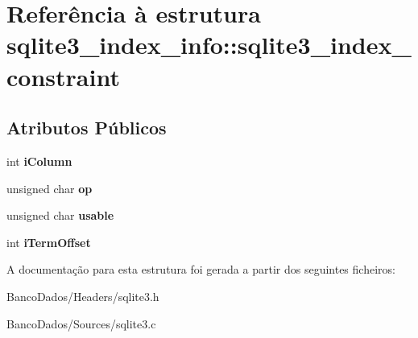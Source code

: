 \hypertarget{structsqlite3__index__info_1_1sqlite3__index__constraint}{\section{Referência à estrutura sqlite3\-\_\-index\-\_\-info\-:\-:sqlite3\-\_\-index\-\_\-constraint}
\label{structsqlite3__index__info_1_1sqlite3__index__constraint}
}
\subsection*{Atributos Públicos}
\begin{DoxyCompactItemize}
\item 
\hypertarget{structsqlite3__index__info_1_1sqlite3__index__constraint_a0f1e207060420058ee2881f2ea368e3a}{int {\bfseries i\-Column}}\label{structsqlite3__index__info_1_1sqlite3__index__constraint_a0f1e207060420058ee2881f2ea368e3a}

\item 
\hypertarget{structsqlite3__index__info_1_1sqlite3__index__constraint_a362f4ec1f71975cb0ac39a8b5e4b1476}{unsigned char {\bfseries op}}\label{structsqlite3__index__info_1_1sqlite3__index__constraint_a362f4ec1f71975cb0ac39a8b5e4b1476}

\item 
\hypertarget{structsqlite3__index__info_1_1sqlite3__index__constraint_ae16e62caeab743cc68bb22227dacb501}{unsigned char {\bfseries usable}}\label{structsqlite3__index__info_1_1sqlite3__index__constraint_ae16e62caeab743cc68bb22227dacb501}

\item 
\hypertarget{structsqlite3__index__info_1_1sqlite3__index__constraint_a4e8368da66f34b7f07b369984b813d1b}{int {\bfseries i\-Term\-Offset}}\label{structsqlite3__index__info_1_1sqlite3__index__constraint_a4e8368da66f34b7f07b369984b813d1b}

\end{DoxyCompactItemize}


A documentação para esta estrutura foi gerada a partir dos seguintes ficheiros\-:\begin{DoxyCompactItemize}
\item 
Banco\-Dados/\-Headers/sqlite3.\-h\item 
Banco\-Dados/\-Sources/sqlite3.\-c\end{DoxyCompactItemize}
